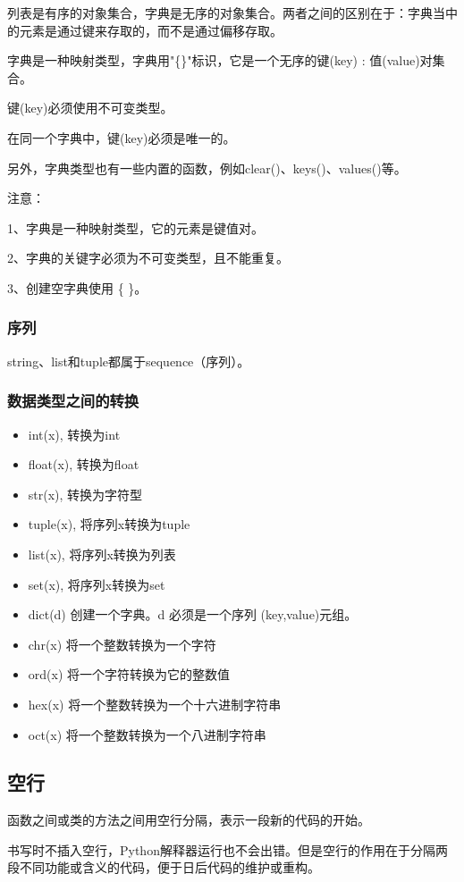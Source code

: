 \documentclass{article}
\begin{document}
列表是有序的对象集合，字典是无序的对象集合。两者之间的区别在于：字典当中的元素是通过键来存取的，而不是通过偏移存取。

字典是一种映射类型，字典用"\{\}"标识，它是一个无序的键(key) : 值(value)对集合。

键(key)必须使用不可变类型。

在同一个字典中，键(key)必须是唯一的。 

另外，字典类型也有一些内置的函数，例如clear()、keys()、values()等。

注意：

    1、字典是一种映射类型，它的元素是键值对。

    2、字典的关键字必须为不可变类型，且不能重复。

    3、创建空字典使用 \{ \}。

\subsubsection{序列}
string、list和tuple都属于sequence（序列）。

\subsubsection{数据类型之间的转换}
\begin{itemize}
\item int(x), 转换为int
\item float(x), 转换为float
\item str(x), 转换为字符型
\item tuple(x), 将序列x转换为tuple
\item list(x), 将序列x转换为列表
\item set(x), 将序列x转换为set
\item dict(d) 创建一个字典。d 必须是一个序列 (key,value)元组。
\item chr(x) 将一个整数转换为一个字符
\item ord(x) 将一个字符转换为它的整数值
\item hex(x) 将一个整数转换为一个十六进制字符串
\item oct(x) 将一个整数转换为一个八进制字符串
\end{itemize}

\subsection{空行}
函数之间或类的方法之间用空行分隔，表示一段新的代码的开始。

书写时不插入空行，Python解释器运行也不会出错。但是空行的作用在于分隔两段不同功能或含义的代码，便于日后代码的维护或重构。
\end{document}
